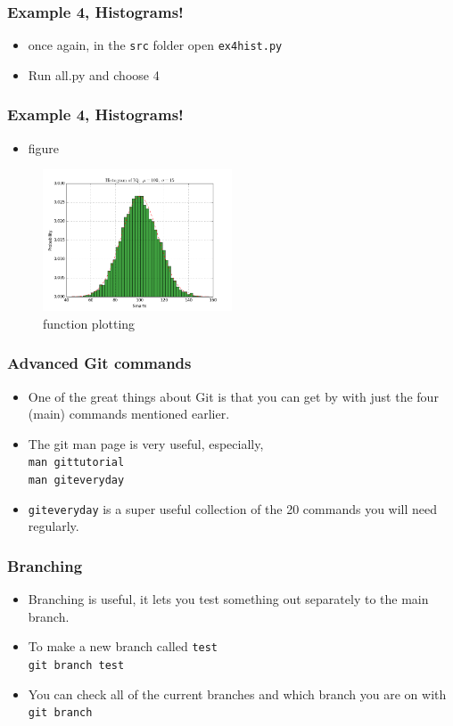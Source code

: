 \documentclass{beamer}
\begin{document}
\begin{frame}
\frametitle{Example 4, Histograms!}
\begin{itemize}
\item once again, in the \texttt{src} folder open \texttt{ex4hist.py}
	\item Run all.py and choose 4 
\end{itemize}
\end{frame}

\begin{frame}
\frametitle{Example 4, Histograms!}
\begin{itemize}
\item figure
\end{itemize}
\begin{figure}
	\centering
	\includegraphics[width=0.5\textwidth]{ex4.png}
	\caption{function plotting}
	\label{fig:function}
\end{figure}
\end{frame}

\begin{frame}
\frametitle{Advanced Git commands}
\begin{itemize}
    \item One of the great things about Git is that you can get by with just the four (main) commands mentioned earlier.
	\item The git man page is very useful, especially, \\
	\texttt{man gittutorial} \\
	\texttt{man giteveryday} \\ 
\item \texttt{giteveryday} is a super useful collection of the 20 commands you will need regularly.
\end{itemize}
\end{frame}


\begin{frame}
\frametitle{Branching}
\begin{itemize}
\item Branching is useful, it lets you test something out separately to the main branch.
\item To make a new branch called \texttt{test} \\
\texttt{git branch test} 
\item You can check all of the current branches and which branch you are on with \\
	\texttt{git branch}
\end{itemize}
\end{frame}
\end{document}
